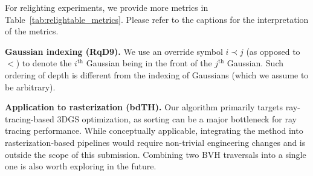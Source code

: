 \documentclass[10pt,twocolumn,letterpaper]{article}
\newcommand{\Rone}{\textcolor{rred}{\textbf{RqD9}}\xspace}
\newcommand{\Rthree}{\textcolor{rgreen}{\textbf{bdTH}}\xspace}
\newcommand{\myparagraph}[1]{\noindent\textbf{#1}}
\begin{document}
For relighting experiments, we provide more metrics in Table~\ref{tab:relightable_metrics}. Please refer to the captions for the interpretation of the metrics.



\myparagraph{Gaussian indexing (\Rone).}
We use an override symbol $i\prec j$ (as opposed to $<$) to denote the $i^{\text{th}}$ Gaussian being in the front of the $j^{\text{th}}$ Gaussian. Such ordering of depth is different from the indexing of Gaussians (which we assume to be arbitrary).

\myparagraph{Application to rasterization (\Rthree).}
Our algorithm primarily targets ray-tracing-based 3DGS optimization, as sorting can be a major bottleneck for ray tracing performance. While conceptually applicable, integrating the method into rasterization-based pipelines would require non-trivial engineering changes and is outside the scope of this submission. 
Combining two BVH traversals into a single one is also worth exploring in the future.
\end{document}
